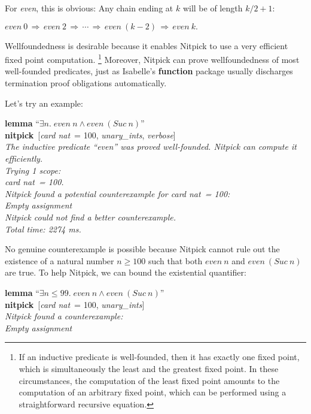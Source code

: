 \documentclass[a4paper,12pt]{article}
\begin{document}
For \textit{even}, this is obvious: Any chain ending at $k$ will be of length
$k/2 + 1$:

\prew
$\textit{even}~0\,\Longrightarrow\, \textit{even}~2\,\Longrightarrow\, \cdots
       \,\Longrightarrow\, \textit{even}~(k - 2)
       \,\Longrightarrow\, \textit{even}~k.$
\postw

Wellfoundedness is desirable because it enables Nitpick to use a very efficient
fixed point computation.%
\footnote{If an inductive predicate is
well-founded, then it has exactly one fixed point, which is simultaneously the
least and the greatest fixed point. In these circumstances, the computation of
the least fixed point amounts to the computation of an arbitrary fixed point,
which can be performed using a straightforward recursive equation.}
Moreover, Nitpick can prove wellfoundedness of most well-founded predicates,
just as Isabelle's \textbf{function} package usually discharges termination
proof obligations automatically.

Let's try an example:

\prew
\textbf{lemma} ``$\exists n.\; \textit{even}~n \mathrel{\land} \textit{even}~(\textit{Suc}~n)$'' \\
\textbf{nitpick}~[\textit{card nat}~= 100, \textit{unary\_ints}, \textit{verbose}] \\[2\smallskipamount]
\slshape The inductive predicate ``\textit{even}'' was proved well-founded.
Nitpick can compute it efficiently. \\[2\smallskipamount]
Trying 1 scope: \\
\hbox{}\qquad \textit{card nat}~= 100. \\[2\smallskipamount]
Nitpick found a potential counterexample for \textit{card nat}~= 100: \\[2\smallskipamount]
\hbox{}\qquad Empty assignment \\[2\smallskipamount]
Nitpick could not find a better counterexample. \\[2\smallskipamount]
Total time: 2274 ms.
\postw

No genuine counterexample is possible because Nitpick cannot rule out the
existence of a natural number $n \ge 100$ such that both $\textit{even}~n$ and
$\textit{even}~(\textit{Suc}~n)$ are true. To help Nitpick, we can bound the
existential quantifier:

\prew
\textbf{lemma} ``$\exists n \mathbin{\le} 99.\; \textit{even}~n \mathrel{\land} \textit{even}~(\textit{Suc}~n)$'' \\
\textbf{nitpick}~[\textit{card nat}~= 100, \textit{unary\_ints}] \\[2\smallskipamount]
\slshape Nitpick found a counterexample: \\[2\smallskipamount]
\hbox{}\qquad Empty assignment
\postw
\end{document}
